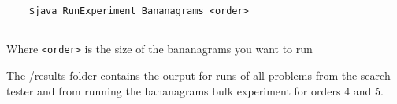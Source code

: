 \documentclass[10pt,letterpaper]{article}
\begin{document}
	\begin{lstlisting}
	$java RunExperiment_Bananagrams <order>
	
	\end{lstlisting}
	Where \lstinline!<order>! is the size of the bananagrams you want to run
	

	
	
	The /results folder contains the ourput for runs of all problems from the search
	tester and from running the bananagrams bulk experiment for orders 4 and 5. 
	

	
	
\end{document}
